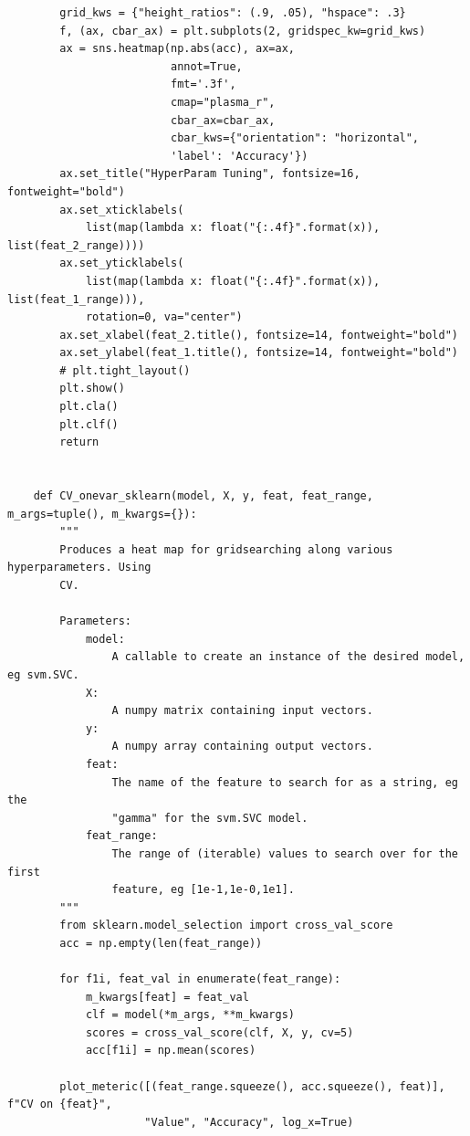 \documentclass{article}
\begin{document}
\begin{verbatim}
        grid_kws = {"height_ratios": (.9, .05), "hspace": .3}
        f, (ax, cbar_ax) = plt.subplots(2, gridspec_kw=grid_kws)
        ax = sns.heatmap(np.abs(acc), ax=ax,
                         annot=True,
                         fmt='.3f',
                         cmap="plasma_r",
                         cbar_ax=cbar_ax,
                         cbar_kws={"orientation": "horizontal",
                         'label': 'Accuracy'})
        ax.set_title("HyperParam Tuning", fontsize=16, fontweight="bold")
        ax.set_xticklabels(
            list(map(lambda x: float("{:.4f}".format(x)), list(feat_2_range))))
        ax.set_yticklabels(
            list(map(lambda x: float("{:.4f}".format(x)), list(feat_1_range))),
            rotation=0, va="center")
        ax.set_xlabel(feat_2.title(), fontsize=14, fontweight="bold")
        ax.set_ylabel(feat_1.title(), fontsize=14, fontweight="bold")
        # plt.tight_layout()
        plt.show()
        plt.cla()
        plt.clf()
        return
    
    
    def CV_onevar_sklearn(model, X, y, feat, feat_range, m_args=tuple(), m_kwargs={}):
        """
        Produces a heat map for gridsearching along various hyperparameters. Using
        CV.
    
        Parameters:
            model:
                A callable to create an instance of the desired model, eg svm.SVC.
            X:
                A numpy matrix containing input vectors.
            y:
                A numpy array containing output vectors.
            feat:
                The name of the feature to search for as a string, eg the
                "gamma" for the svm.SVC model.
            feat_range:
                The range of (iterable) values to search over for the first
                feature, eg [1e-1,1e-0,1e1].
        """
        from sklearn.model_selection import cross_val_score
        acc = np.empty(len(feat_range))
    
        for f1i, feat_val in enumerate(feat_range):
            m_kwargs[feat] = feat_val
            clf = model(*m_args, **m_kwargs)
            scores = cross_val_score(clf, X, y, cv=5)
            acc[f1i] = np.mean(scores)
    
        plot_meteric([(feat_range.squeeze(), acc.squeeze(), feat)], f"CV on {feat}",
                     "Value", "Accuracy", log_x=True)
    

\end{verbatim}
\end{document}
